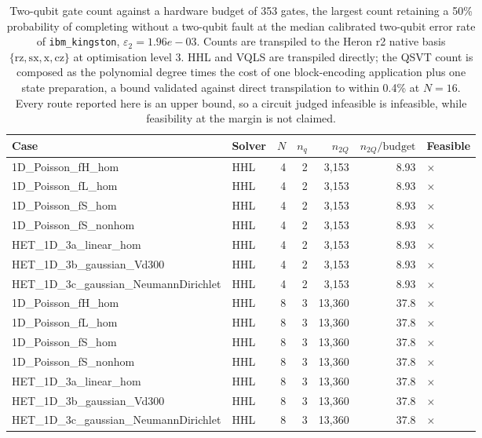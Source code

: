 \begin{table}[htbp]
  \centering
  \caption{Two-qubit gate count against a hardware budget of 353 gates, the largest count retaining a 50\% probability of completing without a two-qubit fault at the median calibrated two-qubit error rate of \texttt{ibm\_kingston}, $\varepsilon_2 = 1.96e-03$. Counts are transpiled to the Heron r2 native basis $\{\mathrm{rz}, \mathrm{sx}, \mathrm{x}, \mathrm{cz}\}$ at optimisation level 3. HHL and VQLS are transpiled directly; the QSVT count is composed as the polynomial degree times the cost of one block-encoding application plus one state preparation, a bound validated against direct transpilation to within 0.4\% at $N=16$. Every route reported here is an upper bound, so a circuit judged infeasible is infeasible, while feasibility at the margin is not claimed.}
  \label{tab:hardware_feasibility}
  \begin{tabular}{llrrrrl}
    \toprule
    Case & Solver & $N$ & $n_q$ & $n_{2Q}$ & $n_{2Q}/\mathrm{budget}$ & Feasible \\
    \midrule
    1D\_Poisson\_fH\_hom & HHL & 4 & 2 & 3,153 & 8.93 & $\times$ \\
    1D\_Poisson\_fL\_hom & HHL & 4 & 2 & 3,153 & 8.93 & $\times$ \\
    1D\_Poisson\_fS\_hom & HHL & 4 & 2 & 3,153 & 8.93 & $\times$ \\
    1D\_Poisson\_fS\_nonhom & HHL & 4 & 2 & 3,153 & 8.93 & $\times$ \\
    HET\_1D\_3a\_linear\_hom & HHL & 4 & 2 & 3,153 & 8.93 & $\times$ \\
    HET\_1D\_3b\_gaussian\_Vd300 & HHL & 4 & 2 & 3,153 & 8.93 & $\times$ \\
    HET\_1D\_3c\_gaussian\_NeumannDirichlet & HHL & 4 & 2 & 3,153 & 8.93 & $\times$ \\
    1D\_Poisson\_fH\_hom & HHL & 8 & 3 & 13,360 & 37.8 & $\times$ \\
    1D\_Poisson\_fL\_hom & HHL & 8 & 3 & 13,360 & 37.8 & $\times$ \\
    1D\_Poisson\_fS\_hom & HHL & 8 & 3 & 13,360 & 37.8 & $\times$ \\
    1D\_Poisson\_fS\_nonhom & HHL & 8 & 3 & 13,360 & 37.8 & $\times$ \\
    HET\_1D\_3a\_linear\_hom & HHL & 8 & 3 & 13,360 & 37.8 & $\times$ \\
    HET\_1D\_3b\_gaussian\_Vd300 & HHL & 8 & 3 & 13,360 & 37.8 & $\times$ \\
    HET\_1D\_3c\_gaussian\_NeumannDirichlet & HHL & 8 & 3 & 13,360 & 37.8 & $\times$ \\

\end{tabular}
\end{table}
